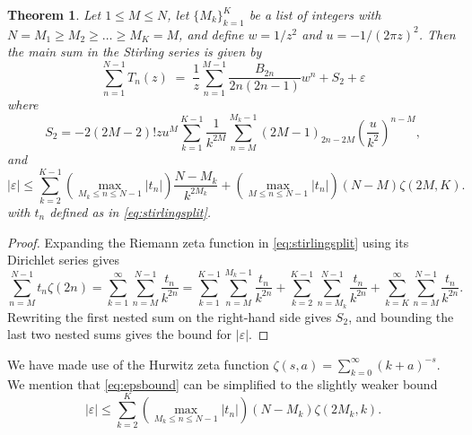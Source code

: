 \documentclass[reqno]{amsart}
\newtheorem{theorem}{Theorem}[section]
\theoremstyle{definition}
\begin{document}
\begin{theorem}
\label{thm:stirlexpand}
Let $1 \le M \le N$, let $\{M_k\}_{k=1}^{K}$ be a list of integers with $N = M_1 \ge M_2 \ge \ldots \ge M_K = M$,
and define $w = 1/z^2$ and $u = -1/(2 \pi z)^2$.
Then the main sum in the Stirling series is given by
\begin{equation}
\sum_{n=1}^{N-1} T_n(z) \; = \; \frac{1}{z} \sum_{n=1}^{M-1} \frac{B_{2n}}{2n(2n-1)} w^n + S_2 + \varepsilon
\end{equation}
where
\begin{equation}
S_2 = - 2 (2M-2)! z u^M \sum_{k=1}^{K-1} \frac{1}{k^{2M}} \sum_{n=M}^{M_k - 1} (2M-1)_{2n-2M} \left(\frac{u}{k^2}\right)^{n-M},
\label{eq:s2rewritten}
\end{equation}
and
\begin{equation}
|\varepsilon| \le \sum_{k=2}^{K-1} \left(\max_{M_k \le n \le N - 1} |t_n| \right) \frac{N-M_k}{k^{2 M_k}} + \left(\max_{M \le n \le N - 1} |t_n| \right) (N-M) \zeta(2M,K).
\label{eq:epsbound}
\end{equation}
with $t_n$ defined as in \eqref{eq:stirlingsplit}.
\end{theorem}

\begin{proof}
Expanding the Riemann zeta function in \eqref{eq:stirlingsplit} using its Dirichlet series
gives
\begin{equation*}
\sum_{n=M}^{N-1} t_n \zeta(2n) =
\sum_{k=1}^{\infty} \sum_{n=M}^{N-1} \frac{t_n}{k^{2n}} =
\sum_{k=1}^{K-1} \sum_{n=M}^{M_k - 1} \frac{t_n}{k^{2n}} +
\sum_{k=2}^{K-1} \sum_{n=M_k}^{N - 1} \frac{t_n}{k^{2n}} +
\sum_{k=K}^{\infty} \sum_{n=M}^{N-1} \frac{t_n}{k^{2n}}.
\end{equation*}
Rewriting the first nested sum on the right-hand side
gives $S_2$, and bounding the last two nested sums gives
the bound for $|\varepsilon|$.
\end{proof}

We have made use of the Hurwitz zeta function
$\zeta(s,a) = \sum_{k=0}^{\infty} (k+a)^{-s}$.
We mention that \eqref{eq:epsbound} can be simplified
to the slightly weaker bound
\begin{equation}
|\varepsilon| \le \sum_{k=2}^{K} \left(\max_{M_k \le n \le N - 1} |t_n| \right) (N-M_k) \zeta(2 M_k, k).
\end{equation}
\end{document}
